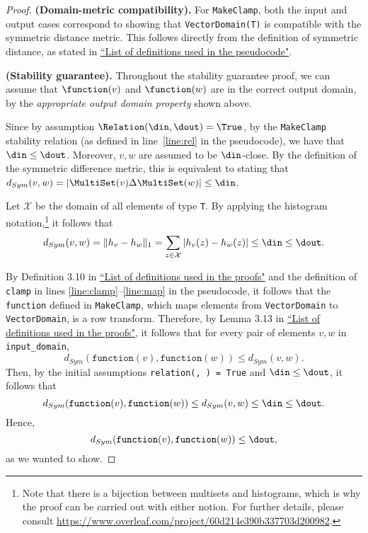\begin{proof}
\smallskip
\textbf{(Domain-metric compatibility).} For \texttt{MakeClamp}, both the input and output cases correspond to showing that \texttt{VectorDomain(T)} is compatible with the symmetric distance metric. This follows directly from the definition of symmetric distance, as stated in \href{https://www.overleaf.com/project/60d215bf90b337ac02200a99}{``List of definitions used in the pseudocode"}.

\smallskip
\textbf{(Stability guarantee).} Throughout the stability guarantee proof, we can assume that $\function(v)$ and $\function(w)$ are in the correct output domain, by the \textit{appropriate output domain property} shown above. 

Since by assumption $\Relation(\din, \dout) = \True$, by the \texttt{MakeClamp} stability relation (as defined in line~\ref{line:rel} in the pseudocode), we have that $\din \leq \dout$. Moreover, $v, w$ are assumed to be $\din$-close. By the definition of the symmetric difference metric, this is equivalent to stating that $d_{Sym}(v, w) = |\MultiSet(v) \Delta \MultiSet(w)| \leq \din$.

Let $\mathcal{X}$ be the domain of all elements of type \texttt{T}. By applying the histogram notation,\footnote{Note that there is a bijection between multisets and histograms, which is why the proof can be carried out with either notion. For further details, please consult \url{https://www.overleaf.com/project/60d214e390b337703d200982}.}  it follows that
\[
d_{Sym}(v, w) = \lVert h_{v} - h_{w}\rVert_1 = \sum_{z \in \mathcal{X}} |h_v(z) - h_w(z)| \leq \din \leq \dout.
\]

By Definition 3.10 in \href{https://www.overleaf.com/project/60d214e390b337703d200982}{``List of definitions used in the proofs"} and the definition of \texttt{clamp} in lines \ref{line:clamp}--\ref{line:map} in the pseudocode, it follows that the \texttt{function} defined in \texttt{MakeClamp}, which maps elements from \texttt{VectorDomain} to \texttt{VectorDomain}, is a row transform. Therefore, by Lemma 3.13 in \href{https://www.overleaf.com/project/60d214e390b337703d200982}{``List of definitions used in the proofs"}, it follows that for every pair of elements $v, w$ in \texttt{input\_domain},
\[
    d_{Sym}(\texttt{function}(v), \texttt{function}(w)) \leq d_{Sym}(v, w).
\]
Then, by the initial assumptions \texttt{relation(\din, \dout) = True} and $\din \leq \dout$, it follows that
\[
    d_{Sym}(\texttt{function}(v), \texttt{function}(w)) \leq d_{Sym}(v, w) \leq \din \leq \dout.
\]
Hence,
\[
    d_{Sym}(\texttt{function}(v), \texttt{function}(w)) \leq \dout,
\]
as we wanted to show.
\end{proof}


